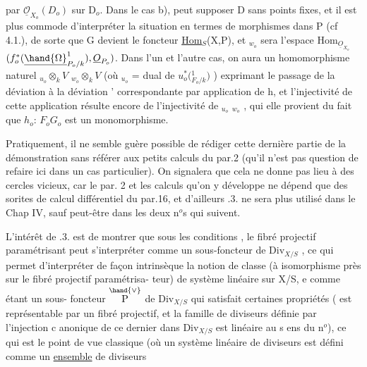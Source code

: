 
par $\underline{\mathcal{O}}_{X_o}(D_o)$ sur D$_o$. Dans le cas b),  peut supposer D sans points
fixes, et il est plus commode d'interpréter la situation en termes de
morphismes dans P (cf 4.1.), de sorte que G devient le foncteur
\underline{Hom}$_S$(X,P), et $_{w_o}$ sera l'espace  Hom$_{\underline{O}_{X_o}}$$(f_o^{*}(\underline{\hand{\Omega}}^{1}_{P_o/k}), \underline{O}_{P_o})$.
Dans l'un et l'autre cas, on aura un homomorphisme naturel
$_{u_o}\otimes_k V$ \hand{$\to$} $_{w_o}\otimes_k V$ (où $_{u_o}$ = dual de $u_o^{*}($\hand{$\Omega$}$^{1}_{F_o/k})$ ) exprimant le passage
de la déviation \hand{$\delta$} à la déviation \hand{$\delta$}' correspondante par application de h,
et l'injectivité de cette application résulte encore de l'injectivité
de $_{u_o}$\hand{$\to$} $_{w_o}$ , qui elle provient du fait que $h_o$: $F_o$\hand{$\to$}$G_o$ est un
monomorphisme.
\margin{$/$}

Pratiquement, il ne semble guère possible de rédiger cette dernière
partie de la démonstration sans référer aux petits calculs du par.2
(qu'il n'est pas question de refaire ici dans un cas particulier). On
signalera que cela ne donne pas lieu à des cercles vicieux, car le par.
2  et les calculs qu'on y  développe ne dépend que des sorites
de calcul différentiel du par.16, et d'ailleurs .3. ne sera plus
utilisé dans le Chap IV, sauf peut-être dans les deux n$^{o}$s qui suivent.

L'intérêt de .3. est de montrer que sous les conditions ,
le fibré projectif paramétrisant peut s'interpréter comme un sous-foncteur
de Div$_{X/S}$ , ce qui permet d'interpréter de façon intrinsèque la notion
de classe (à isomorphisme près sur le  fibré projectif paramétrisa-%
teur) de système linéaire sur X/S, e comme étant un sous-
foncteur $\overset{\hand{\vee}}{\text{P}}$ de Div$_{X/S}$ qui satisfait certaines propriétés ( est
représentable par un fibré projectif, et la famille de diviseurs définie
par l'injection c anonique de ce dernier dans Div$_{X/S}$ est linéaire au s ens
du n$^{o}$), ce qui est  le point de vue classique (où un
système linéaire de diviseurs est défini comme un \uline{ensemble} de diviseurs

